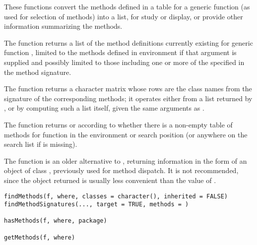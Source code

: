 \begin{Description}\relax
These functions convert the methods defined in a table for a generic
function (as used for selection of methods) into a list, for study or
display, or provide other information summarizing the methods.

The function  returns a list of the method
definitions currently existing for generic function , limited
to the methods defined in environment  if that argument is
supplied and possibly limited to those including one or more of the
specified  in the method signature.

The function  returns a character matrix
whose rows are the class names from the signature of the corresponding
methods; it operates either from a list returned by
, or by computing such a list itself, given the same
arguments as  .

The function  returns  or 
according to whether there is a non-empty table of methods for
function  in the environment or search position 
(or anywhere on the search list if  is missing).

The function  is an older alternative to
 , returning information in the form of an object of
class , previously used for method dispatch.  It is
not recommended, since the object returned is usually less convenient
than the value of .  
\end{Description}
%
\begin{Usage}
\begin{verbatim}
findMethods(f, where, classes = character(), inherited = FALSE)
findMethodSignatures(..., target = TRUE, methods = )

hasMethods(f, where, package)

getMethods(f, where)
\end{verbatim}
\end{Usage}
%
